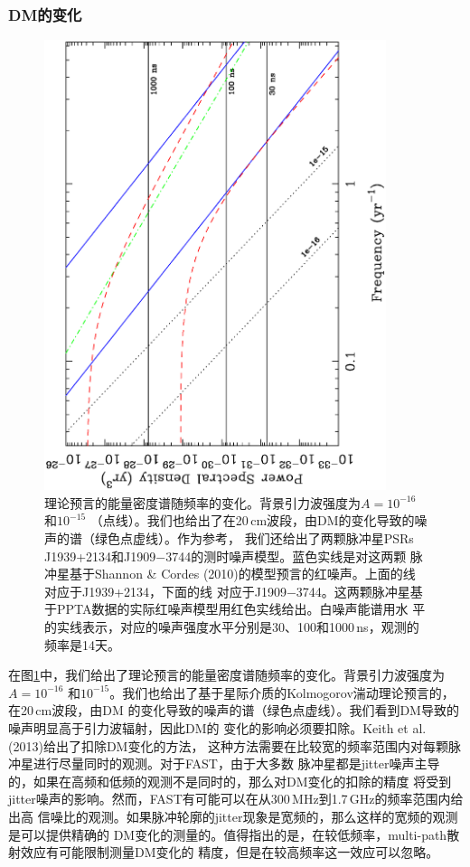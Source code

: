 \subsubsection{DM的变化}

\begin{figure}
\begin{center}
\includegraphics[angle=-90,width=10cm]{noiseLimits.ps}
\caption{理论预言的能量密度谱随频率的变化。背景引力波强度为$A = 10^{-16}$和$10^{-15}$
（点线）。我们也给出了在20\,cm波段，由DM的变化导致的噪声的谱（绿色点虚线）。作为参考，
我们还给出了两颗脉冲星PSRs J1939+2134和J1909$-$3744的测时噪声模型。蓝色实线是对这两颗
脉冲星基于Shannon \& Cordes (2010)的模型预言的红噪声。上面的线对应于J1939+2134，下面的线
对应于J1909$-$3744。这两颗脉冲星基于PPTA数据的实际红噪声模型用红色实线给出。白噪声能谱用水
平的实线表示，对应的噪声强度水平分别是30、100和1000\,ns，观测的频率是14天。} 
\label{fg:noise}
\end{center}
\end{figure}

在图\ref{fg:noise}中，我们给出了理论预言的能量密度谱随频率的变化。背景引力波强度为$A = 10^{-16}$
和$10^{-15}$。我们也给出了基于星际介质的Kolmogorov湍动理论预言的，在20\,cm波段，由DM
的变化导致的噪声的谱（绿色点虚线）。我们看到DM导致的噪声明显高于引力波辐射，因此DM的
变化的影响必须要扣除。Keith et al. (2013)\supercite{Keith13}给出了扣除DM变化的方法，
这种方法需要在比较宽的频率范围内对每颗脉冲星进行尽量同时的观测。对于FAST，由于大多数
脉冲星都是jitter噪声主导的，如果在高频和低频的观测不是同时的，那么对DM变化的扣除的精度
将受到jitter噪声的影响。然而，FAST有可能可以在从300\,MHz到1.7\,GHz的频率范围内给出高
信噪比的观测。如果脉冲轮廓的jitter现象是宽频的，那么这样的宽频的观测是可以提供精确的
DM变化的测量的。值得指出的是，在较低频率，multi-path散射效应有可能限制测量DM变化的
精度，但是在较高频率这一效应可以忽略。

